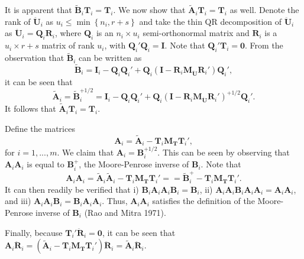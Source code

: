 \documentclass[12pt]{article}
\begin{document}
It is apparent that
\(\tilde{\mathbf{B}}_i \mathbf{T}_i = \mathbf{T}_i\). We now show that
\(\tilde{\mathbf{A}}_i \mathbf{T}_i = \mathbf{T}_i\) as well. Denote the
rank of \(\mathbf{\ddot{U}}_i\) as
\(u_i \leq \min \left\{n_i, r + s \right\}\) and take the thin QR
decomposition of \(\mathbf{\ddot{U}}_i\) as
\(\mathbf{\ddot{U}}_i = \mathbf{Q}_i \mathbf{R}_i\), where
\(\mathbf{Q}_i\) is an \(n_i \times u_i\) semi-orthonormal matrix and
\(\mathbf{R}_i\) is a \(u_i \times r + s\) matrix of rank \(u_i\), with
\(\mathbf{Q}_i'\mathbf{Q}_i = \mathbf{I}\). Note that
\(\mathbf{Q}_i'\mathbf{T}_i = \mathbf{0}\). From the observation that
\(\tilde{\mathbf{B}}_i\) can be written as \[
\tilde{\mathbf{B}}_i = \mathbf{I}_i - \mathbf{Q}_i \mathbf{Q}_i' + \mathbf{Q}_i \left(\mathbf{I} - \mathbf{R}_i \mathbf{M}_{\mathbf{\ddot{U}}} \mathbf{R}_i'\right)\mathbf{Q}_i',
\] it can be seen that \begin{equation}
\tilde{\mathbf{A}}_i = \tilde{\mathbf{B}}_i^{+1/2} = \mathbf{I}_i - \mathbf{Q}_i \mathbf{Q}_i' + \mathbf{Q}_i \left(\mathbf{I} - \mathbf{R}_i \mathbf{M}_{\mathbf{\ddot{U}}} \mathbf{R}_i'\right)^{+1/2} \mathbf{Q}_i'.
\end{equation} It follows that
\(\tilde{\mathbf{A}}_i \mathbf{T}_i = \mathbf{T}_i\).

Define the matrices \begin{equation}
\mathbf{A}_i = \tilde{\mathbf{A}}_i - \mathbf{T}_i \mathbf{M_T}\mathbf{T}_i',
\end{equation} for \(i = 1,...,m\). We claim that
\(\mathbf{A}_i = \mathbf{B}_i^{+1/2}\). This can be seen by observing
that \(\mathbf{A}_i \mathbf{A}_i\) is equal to \(\mathbf{B}_i^+\), the
Moore-Penrose inverse of \(\mathbf{B}_i\). Note that \begin{equation}
\mathbf{A}_i \mathbf{A}_i = \tilde{\mathbf{A}}_i \tilde{\mathbf{A}}_i - \mathbf{T}_i \mathbf{M_T}\mathbf{T}_i' =  = \tilde{\mathbf{B}}_i^+ - \mathbf{T}_i \mathbf{M_T}\mathbf{T}_i'.
\end{equation} It can then readily be verified that i)
\(\mathbf{B}_i \mathbf{A}_i \mathbf{A}_i \mathbf{B}_i = \mathbf{B}_i\),
ii)
\(\mathbf{A}_i \mathbf{A}_i \mathbf{B}_i \mathbf{A}_i \mathbf{A}_i = \mathbf{A}_i \mathbf{A}_i\),
and iii)
\(\mathbf{A}_i \mathbf{A}_i \mathbf{B}_i = \mathbf{B}_i \mathbf{A}_i \mathbf{A}_i\).
Thus, \(\mathbf{A}_i\mathbf{A}_i\) satisfies the definition of the
Moore-Penrose inverse of \(\mathbf{B}_i\) (Rao and Mitra 1971).

Finally, because \(\mathbf{T}_i ' \mathbf{\ddot{R}}_i= \mathbf{0}\), it
can be seen that
\(\mathbf{A}_i \mathbf{\ddot{R}}_i = \left(\tilde{\mathbf{A}}_i - \mathbf{T}_i \mathbf{M_T}\mathbf{T}_i'\right)\mathbf{\ddot{R}}_i = \tilde{\mathbf{A}}_i \mathbf{\ddot{R}}_i\).
\end{document}
